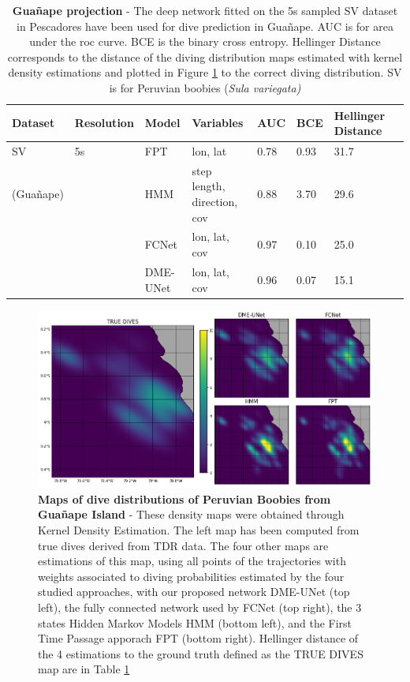 \documentclass{article}
\begin{document}
\begin{table}[h]
 \caption{\textbf{Gua\~nape projection} - The deep network fitted on the 5s sampled SV dataset in Pescadores have been used for dive prediction in Gua\~nape. AUC is for area under the roc curve. BCE is the binary cross entropy. Hellinger Distance corresponds to the distance of the diving distribution maps estimated with kernel density estimations and plotted in Figure \ref{figure5} to the correct diving distribution. SV is for Peruvian boobies (\textit{Sula variegata)}}
  \centering
  \begin{tabular}{llllllll}
    \toprule
    Dataset  &  Resolution &  Model & Variables & AUC & BCE & Hellinger Distance \\
    \midrule
    SV      & 5s  & FPT    & lon, lat               & 0.78 & 0.93 & 31.7          \\
  (Gua\~nape) &     & HMM    & step length, direction, cov & 0.88 & 3.70 & 29.6     \\
            &     & FCNet  & lon, lat, cov  & 0.97 & 0.10 & 25.0                  \\
            &     & DME-UNet   & lon, lat, cov  & 0.96 & 0.07 & 15.1              \\
    \bottomrule
  \end{tabular}
  \label{table3}
\end{table}


\begin{figure}[!h]
  \centering
  \includegraphics[scale=0.5]{figure5.png}
  \caption{\textbf{Maps of dive distributions of Peruvian Boobies from Gua\~nape Island} - These density maps were obtained through Kernel Density Estimation. The left map has been computed from true dives derived from TDR data. The four other maps are estimations of this map, using  all points of the trajectories with weights associated to diving probabilities estimated by the four studied approaches,  with our proposed network DME-UNet (top left), the fully connected network used by \cite{browning_predicting_2018}  FCNet (top right), the 3 states Hidden Markov Models HMM (bottom left), and the First Time Passage apporach FPT (bottom right). Hellinger distance of the 4 estimations to the ground truth defined as the TRUE DIVES map are in Table \ref{table3}}
  \label{figure5}
\end{figure}
\end{document}
